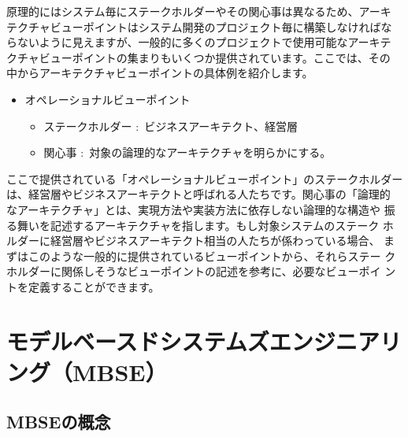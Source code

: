 原理的にはシステム毎にステークホルダーやその関心事は異なるため、アーキ
テクチャビューポイントはシステム開発のプロジェクト毎に構築しなければな
らないように見えますが、一般的に多くのプロジェクトで使用可能なアーキテ
クチャビューポイントの集まりもいくつか提供されています。ここでは、その
中からアーキテクチャビューポイントの具体例を紹介します。

\begin{itemize}
\item オペレーショナルビューポイント
  \begin{itemize}
\item ステークホルダー $\colon$ ビジネスアーキテクト、経営層
\item 関心事 $\colon$ 対象の論理的なアーキテクチャを明らかにする。
  \end{itemize}
\end{itemize}
ここで提供されている「オペレーショナルビューポイント」のステークホルダー
は、経営層やビジネスアーキテクトと呼ばれる人たちです。関心事の「論理的
  なアーキテクチャ」とは、実現方法や実装方法に依存しない論理的な構造や
振る舞いを記述するアーキテクチャを指します。もし対象システムのステーク
ホルダーに経営層やビジネスアーキテクト相当の人たちが係わっている場合、
まずはこのような一般的に提供されているビューポイントから、それらステー
クホルダーに関係しそうなビューポイントの記述を参考に、必要なビューポイ
ントを定義することができます。

\section{モデルベースドシステムズエンジニアリング（MBSE）}

\subsection{MBSEの概念}

